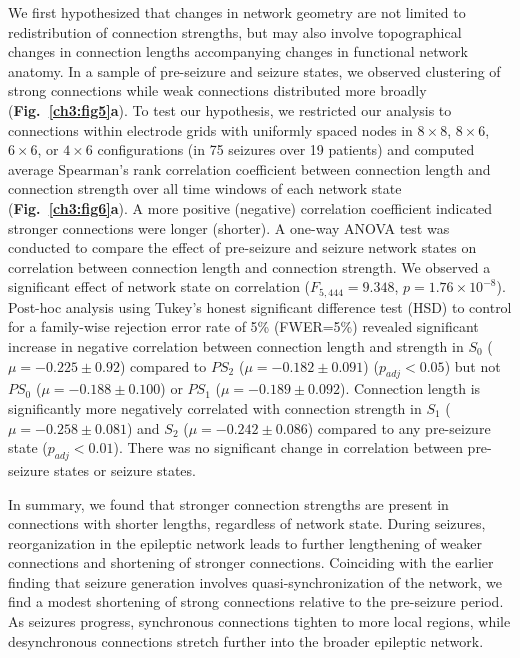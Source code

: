 We first hypothesized that changes in network geometry are not limited to redistribution of connection strengths, but may also involve topographical changes in connection lengths accompanying changes in functional network anatomy. In a sample of pre-seizure and seizure states, we observed clustering of strong connections while weak connections distributed more broadly (\textbf{Fig.~{\ref{ch3:fig5}a}}). To test our hypothesis, we restricted our analysis to connections within electrode grids with uniformly spaced nodes in $8 \times 8$, $8 \times 6$, $6 \times 6$, or $4 \times 6$ configurations (in 75 seizures over 19 patients) and computed average Spearman's rank correlation coefficient between connection length and connection strength over all time windows of each network state (\textbf{Fig.~{\ref{ch3:fig6}a}}). A more positive (negative) correlation coefficient indicated stronger connections were longer (shorter). A one-way ANOVA test was conducted to compare the effect of pre-seizure and seizure network states on correlation between connection length and connection strength. We observed a significant effect of network state on correlation ($F_{5,444}=9.348$,  $p=1.76\times10^{-8}$). Post-hoc analysis using Tukey's honest significant difference test (HSD) to control for a family-wise rejection error rate of 5\% (FWER=5\%) revealed significant increase in negative correlation between connection length and strength in $S_0$ ($\mu=-0.225\pm0.92$) compared to $PS_2$ ($\mu=-0.182\pm0.091$) ($p_{adj}<0.05$) but not $PS_0$ ($\mu=-0.188\pm0.100$) or $PS_1$ ($\mu=-0.189\pm0.092$). Connection length is significantly more negatively correlated with connection strength in $S_1$ ($\mu=-0.258\pm0.081$) and $S_2$ ($\mu=-0.242\pm0.086$) compared to any pre-seizure state ($p_{adj}<0.01$). There was no significant change in correlation between pre-seizure states or seizure states.
    
In summary, we found that stronger connection strengths are present in connections with shorter lengths, regardless of network state. During seizures, reorganization in the epileptic network leads to further lengthening of weaker connections and shortening of stronger connections. Coinciding with the earlier finding that seizure generation involves quasi-synchronization of the network, we find a modest shortening of strong connections relative to the pre-seizure period. As seizures progress, synchronous connections tighten to more local regions, while desynchronous connections stretch further into the broader epileptic network.

